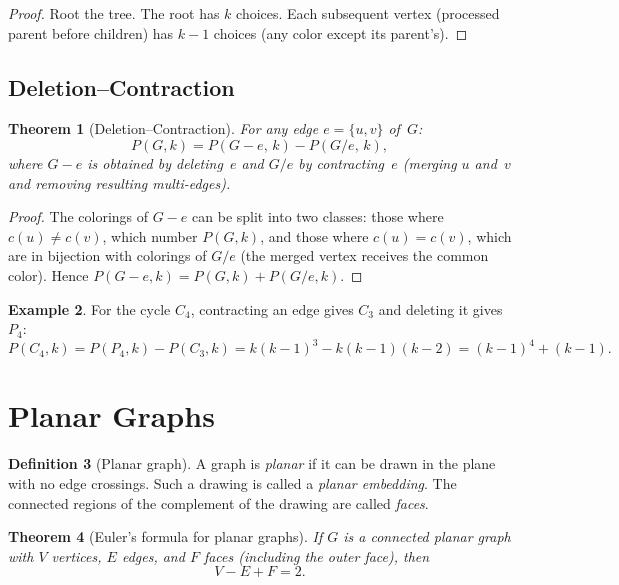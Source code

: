 \documentclass[12pt,a4paper,openany]{book}
\theoremstyle{definition}
\newtheorem{definition}{Definition}[chapter]
\newtheorem{example}[definition]{Example}
\theoremstyle{plain}
\newtheorem{theorem}[definition]{Theorem}
\theoremstyle{remark}
\begin{document}
\begin{proof}
Root the tree.  The root has $k$ choices.  Each subsequent vertex
(processed parent before children) has $k-1$ choices (any color except
its parent's).
\end{proof}

\subsection{Deletion--Contraction}
\label{ssec:del-contract}

\begin{theorem}[Deletion--Contraction]
\label{thm:del-contract}
For any edge $e=\{u,v\}$ of~$G$:
\[
  P(G,k)=P(G-e,\,k)-P(G/e,\,k),
\]
where $G-e$ is obtained by deleting~$e$ and $G/e$ by contracting~$e$
(merging $u$ and~$v$ and removing resulting multi-edges).
\end{theorem}

\begin{proof}
The colorings of $G-e$ can be split into two classes: those where
$c(u)\ne c(v)$, which number $P(G,k)$, and those where $c(u)=c(v)$,
which are in bijection with colorings of $G/e$ (the merged vertex
receives the common color).  Hence
$P(G-e,k)=P(G,k)+P(G/e,k)$.
\end{proof}

\begin{example}
\label{ex:chromatic-C4}
For the cycle $C_4$, contracting an edge gives $C_3$ and deleting it
gives $P_4$:
\[
  P(C_4,k)=P(P_4,k)-P(C_3,k)=k(k-1)^3-k(k-1)(k-2)
  =(k-1)^4+(k-1).
\]
\end{example}


\section{Planar Graphs}
\label{sec:planar}

\begin{definition}[Planar graph]
\label{def:planar}
A graph is \emph{planar} if it can be drawn in the plane with no edge
crossings.  Such a drawing is called a \emph{planar embedding}.  The
connected regions of the complement of the drawing are called
\emph{faces}.
\end{definition}

\begin{theorem}[Euler's formula for planar graphs]
\label{thm:euler-formula}
If $G$ is a connected planar graph with $V$ vertices, $E$ edges, and
$F$ faces (including the outer face), then
\[
  V-E+F=2.
\]
\end{theorem}
\end{document}
